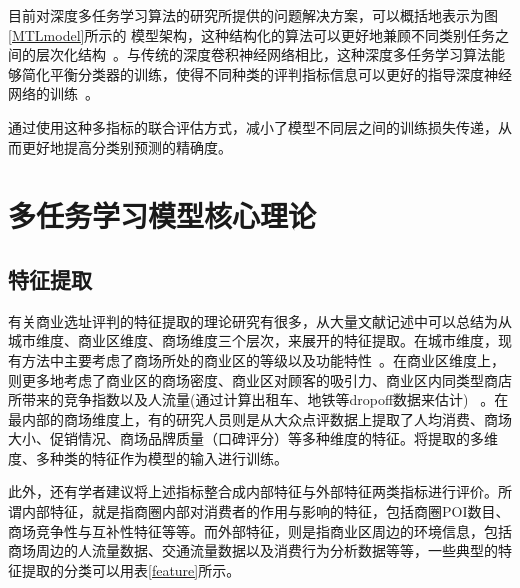\documentclass[UTF8]{llncs}
\begin{document}
目前对深度多任务学习算法的研究所提供的问题解决方案，可以概括地表示为图\ref{MTLmodel}所示的 模型架构，这种结构化的算法可以更好地兼顾不同类别任务之间的层次化结构~\cite{ZhaoQiLu}。与传统的深度卷积神经网络相比，这种深度多任务学习算法能够简化平衡分类器的训练，使得不同种类的评判指标信息可以更好的指导深度神经网络的训练~\cite{DataClassify}。

通过使用这种多指标的联合评估方式，减小了模型不同层之间的训练损失传递，从而更好地提高分类别预测的精确度。



\section{多任务学习模型核心理论}
\subsection{特征提取}
有关商业选址评判的特征提取的理论研究有很多，从大量文献记述中可以总结为从城市维度、商业区维度、商场维度三个层次，来展开的特征提取。在城市维度，现有方法中主要考虑了商场所处的商业区的等级以及功能特性~\cite{cityLevel}。在商业区维度上，则更多地考虑了商业区的商场密度、商业区对顾客的吸引力、商业区内同类型商店所带来的竞争指数以及人流量(通过计算出租车、地铁等dropoff数据来估计)~\cite{mallLevel} 。在最内部的商场维度上，有的研究人员则是从大众点评数据上提取了人均消费、商场大小、促销情况、商场品牌质量（口碑评分）等多种维度的特征。将提取的多维度、多种类的特征作为模型的输入进行训练。

此外，还有学者建议将上述指标整合成内部特征与外部特征两类指标进行评价。所谓内部特征，就是指商圈内部对消费者的作用与影响的特征，包括商圈POI数目、商场竞争性与互补性特征等等。而外部特征，则是指商业区周边的环境信息，包括商场周边的人流量数据、交通流量数据以及消费行为分析数据等等，一些典型的特征提取的分类可以用表\ref{feature}所示。
\end{document}
